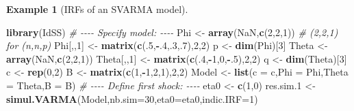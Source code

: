 \documentclass[
  11pt,
]{book}
\newenvironment{Shaded}{\begin{snugshade}}{\end{snugshade}}
\newcommand{\AttributeTok}[1]{\textcolor[rgb]{0.13,0.29,0.53}{#1}}
\newcommand{\CommentTok}[1]{\textcolor[rgb]{0.56,0.35,0.01}{\textit{#1}}}
\newcommand{\ConstantTok}[1]{\textcolor[rgb]{0.56,0.35,0.01}{#1}}
\newcommand{\DecValTok}[1]{\textcolor[rgb]{0.00,0.00,0.81}{#1}}
\newcommand{\FloatTok}[1]{\textcolor[rgb]{0.00,0.00,0.81}{#1}}
\newcommand{\FunctionTok}[1]{\textcolor[rgb]{0.13,0.29,0.53}{\textbf{#1}}}
\newcommand{\NormalTok}[1]{#1}
\newcommand{\OtherTok}[1]{\textcolor[rgb]{0.56,0.35,0.01}{#1}}
\newcommand{\SpecialCharTok}[1]{\textcolor[rgb]{0.81,0.36,0.00}{\textbf{#1}}}
\theoremstyle{definition}
\theoremstyle{definition}
\newtheorem{example}{Example}[chapter]
\theoremstyle{definition}
\theoremstyle{definition}
\theoremstyle{remark}
\begin{document}
\begin{example}[IRFs of an SVARMA model]
\begin{Shaded}
\begin{Highlighting}[]
\FunctionTok{library}\NormalTok{(IdSS)}
\CommentTok{\# {-}{-}{-}{-} Specify model: {-}{-}{-}{-}}
\NormalTok{Phi }\OtherTok{\textless{}{-}} \FunctionTok{array}\NormalTok{(}\ConstantTok{NaN}\NormalTok{,}\FunctionTok{c}\NormalTok{(}\DecValTok{2}\NormalTok{,}\DecValTok{2}\NormalTok{,}\DecValTok{1}\NormalTok{)) }\CommentTok{\# (2,2,1) for (n,n,p)}
\NormalTok{Phi[,,}\DecValTok{1}\NormalTok{] }\OtherTok{\textless{}{-}} \FunctionTok{matrix}\NormalTok{(}\FunctionTok{c}\NormalTok{(.}\DecValTok{5}\NormalTok{,}\SpecialCharTok{{-}}\NormalTok{.}\DecValTok{4}\NormalTok{,.}\DecValTok{3}\NormalTok{,.}\DecValTok{7}\NormalTok{),}\DecValTok{2}\NormalTok{,}\DecValTok{2}\NormalTok{)}
\NormalTok{p }\OtherTok{\textless{}{-}} \FunctionTok{dim}\NormalTok{(Phi)[}\DecValTok{3}\NormalTok{]}
\NormalTok{Theta }\OtherTok{\textless{}{-}} \FunctionTok{array}\NormalTok{(}\ConstantTok{NaN}\NormalTok{,}\FunctionTok{c}\NormalTok{(}\DecValTok{2}\NormalTok{,}\DecValTok{2}\NormalTok{,}\DecValTok{1}\NormalTok{))}
\NormalTok{Theta[,,}\DecValTok{1}\NormalTok{] }\OtherTok{\textless{}{-}} \FunctionTok{matrix}\NormalTok{(}\FunctionTok{c}\NormalTok{(.}\DecValTok{4}\NormalTok{,}\SpecialCharTok{{-}}\DecValTok{1}\NormalTok{,}\DecValTok{0}\NormalTok{,}\SpecialCharTok{{-}}\NormalTok{.}\DecValTok{5}\NormalTok{),}\DecValTok{2}\NormalTok{,}\DecValTok{2}\NormalTok{)}
\NormalTok{q }\OtherTok{\textless{}{-}} \FunctionTok{dim}\NormalTok{(Theta)[}\DecValTok{3}\NormalTok{]}
\NormalTok{c }\OtherTok{\textless{}{-}} \FunctionTok{rep}\NormalTok{(}\DecValTok{0}\NormalTok{,}\DecValTok{2}\NormalTok{)}
\NormalTok{B }\OtherTok{\textless{}{-}} \FunctionTok{matrix}\NormalTok{(}\FunctionTok{c}\NormalTok{(}\DecValTok{1}\NormalTok{,}\SpecialCharTok{{-}}\DecValTok{1}\NormalTok{,}\DecValTok{2}\NormalTok{,}\DecValTok{1}\NormalTok{),}\DecValTok{2}\NormalTok{,}\DecValTok{2}\NormalTok{)}
\NormalTok{Model }\OtherTok{\textless{}{-}} \FunctionTok{list}\NormalTok{(}\AttributeTok{c =}\NormalTok{ c,}\AttributeTok{Phi =}\NormalTok{ Phi,}\AttributeTok{Theta =}\NormalTok{ Theta,}\AttributeTok{B =}\NormalTok{ B)}
\CommentTok{\# {-}{-}{-}{-} Define first shock: {-}{-}{-}{-}}
\NormalTok{eta0 }\OtherTok{\textless{}{-}} \FunctionTok{c}\NormalTok{(}\DecValTok{1}\NormalTok{,}\DecValTok{0}\NormalTok{)}
\NormalTok{res.sim}\FloatTok{.1} \OtherTok{\textless{}{-}} \FunctionTok{simul.VARMA}\NormalTok{(Model,}\AttributeTok{nb.sim=}\DecValTok{30}\NormalTok{,}\AttributeTok{eta0=}\NormalTok{eta0,}\AttributeTok{indic.IRF=}\DecValTok{1}\NormalTok{)}

\end{Highlighting}
\end{Shaded}
\end{example}
\end{document}
